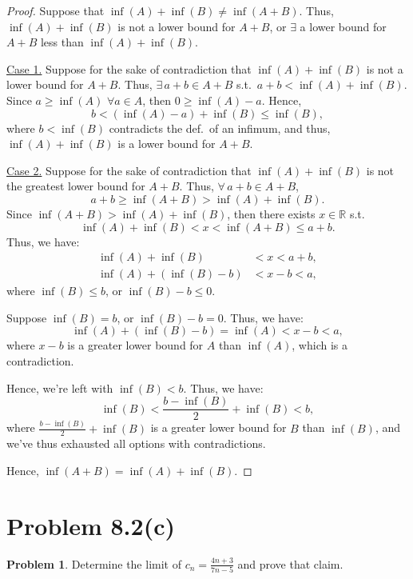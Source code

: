 \documentclass{article}
\theoremstyle{definition}
\newtheorem*{problem}{Problem}
\begin{document}
\begin{proof}
Suppose that $\inf(A) + \inf(B) \neq \inf(A+B)$. Thus, $\inf(A) + \inf(B)$ is not a lower bound for $A+B$, or $\exists$ a lower bound for $A+B$ less than $\inf(A) + \inf(B)$.

\medskip
\underline{Case 1.} Suppose for the sake of contradiction that $\inf(A) + \inf(B)$ is not a lower bound for $A+B$. Thus, $\exists\, a + b \in A + B$ s.t.\ $a + b < \inf(A) + \inf(B)$. Since $a \geq \inf(A)$ $\forall a \in A$, then $0 \geq \inf(A) - a$. Hence,
\[
b < (\inf(A) - a) + \inf(B) \leq \inf(B),
\]
where $b < \inf(B)$ contradicts the def.\ of an infimum, and thus, $\inf(A) + \inf(B)$ is a lower bound for $A+B$.

\medskip
\underline{Case 2.} Suppose for the sake of contradiction that $\inf(A) + \inf(B)$ is not the greatest lower bound for $A+B$. Thus, $\forall\, a + b \in A + B$,
\[
a + b \geq \inf(A+B) > \inf(A) + \inf(B).
\]
Since $\inf(A+B) > \inf(A) + \inf(B)$, then there exists $x \in \mathbb{R}$ s.t.
\[
\inf(A) + \inf(B) < x < \inf(A+B) \leq a + b.
\]
Thus, we have:
\begin{align*}
\inf(A) + \inf(B) &< x < a + b, \\
\inf(A) + (\inf(B) - b) &< x - b < a,
\end{align*}
where $\inf(B) \leq b$, or $\inf(B) - b \leq 0$.

Suppose $\inf(B) = b$, or $\inf(B) - b = 0$. Thus, we have:
\[
\inf(A) + (\inf(B) - b) = \inf(A) < x - b < a,
\]
where $x - b$ is a greater lower bound for $A$ than $\inf(A)$, which is a contradiction.

Hence, we're left with $\inf(B) < b$. Thus, we have:
\[
\inf(B) < \frac{b - \inf(B)}{2} + \inf(B) < b,
\]
where $\frac{b - \inf(B)}{2} + \inf(B)$ is a greater lower bound for $B$ than $\inf(B)$, and we've thus exhausted all options with contradictions.

Hence, $\inf(A+B) = \inf(A) + \inf(B)$.
\end{proof}

\clearpage
\section{Problem 8.2(c)}

\begin{problem}
Determine the limit of $c_n = \frac{4n+3}{7n-5}$ and prove that claim.
\end{problem}
\end{document}
